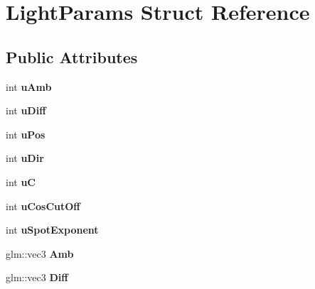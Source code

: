 \hypertarget{struct_light_params}{}\section{Light\+Params Struct Reference}
\label{struct_light_params}
\subsection*{Public Attributes}
\begin{DoxyCompactItemize}
\item 
\mbox{\label{struct_light_params_ad7ba6aa7e333ba4552cddce6e58ee11b}} 
int {\bfseries u\+Amb}
\item 
\mbox{\label{struct_light_params_a4b08902022f1049975054635ab02a373}} 
int {\bfseries u\+Diff}
\item 
\mbox{\label{struct_light_params_af93dcacd5dc9afa86f47c1fc6dafd1de}} 
int {\bfseries u\+Pos}
\item 
\mbox{\label{struct_light_params_a2c5ef6397619c3d9f9ebc3f85a60e271}} 
int {\bfseries u\+Dir}
\item 
\mbox{\label{struct_light_params_a19c2f90d8bd6212458a36faba22a25d3}} 
int {\bfseries uC}
\item 
\mbox{\label{struct_light_params_aede0ecb733b98b5d9fa9aea079a19e32}} 
int {\bfseries u\+Cos\+Cut\+Off}
\item 
\mbox{\label{struct_light_params_af5f5bd61015288e5fe8c4fe99ae22948}} 
int {\bfseries u\+Spot\+Exponent}
\item 
\mbox{\label{struct_light_params_a27052b5211820c45d996f5106880514d}} 
glm\+::vec3 {\bfseries Amb}
\item 
\mbox{\label{struct_light_params_a68f0078bf3744578ae5a655365c913b1}} 
glm\+::vec3 {\bfseries Diff}
\item 
\mbox{\label{struct_light_params_ad7dd75d1bf55dd855ced7c5cd48a0a94}} 

\end{DoxyCompactItemize}
